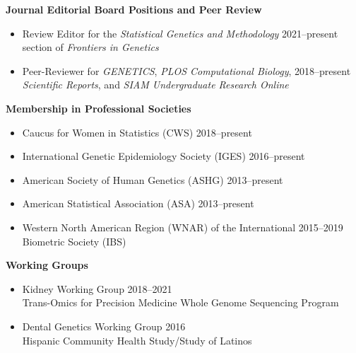 \documentclass[margin]{res}
\begin{document}
\begin{resume}
\hspace{0.1cm}\textbf{Journal Editorial Board Positions and Peer Review} 
\begin{itemize} %
\item Review Editor for the \textit{Statistical Genetics and Methodology}  \hfill 2021--present \\ section of \textit{Frontiers in Genetics} 
\item Peer-Reviewer for \textit{GENETICS}, \textit{PLOS Computational Biology}, \hfill 2018--present \\  \textit{Scientific Reports}, and \textit{SIAM Undergraduate Research Online} %
\end{itemize} %

\hspace{0.1cm}\textbf{Membership in Professional Societies}
\begin{itemize}	 %
\item Caucus for Women in Statistics (CWS) \hfill 2018--present
\item International Genetic Epidemiology Society (IGES) \hfill 2016--present
\item American Society of Human Genetics (ASHG) \hfill 2013--present
\item American Statistical Association (ASA) \hfill 2013--present
\item Western North American Region (WNAR) of the International \hfill 2015--2019 \\  Biometric Society (IBS)  %
\end{itemize}
	
\hspace{0.1cm}\textbf{Working Groups}
\begin{itemize} %
\item Kidney Working Group \hfill 2018--2021 \\ Trans-Omics for Precision Medicine Whole Genome Sequencing Program 
\item Dental Genetics Working Group \hfill 2016 \\ Hispanic Community Health Study/Study of Latinos \\
\end{itemize}
						



\end{resume}
\end{document}
